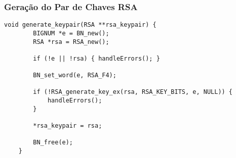 \documentclass[a4paper,12pt]{article}
\begin{document}
\subsubsection*{Geração do Par de Chaves RSA}
\begin{lstlisting}[style=CStyle]
    void generate_keypair(RSA **rsa_keypair) {
        BIGNUM *e = BN_new();
        RSA *rsa = RSA_new();

        if (!e || !rsa) { handleErrors(); }

        BN_set_word(e, RSA_F4);

        if (!RSA_generate_key_ex(rsa, RSA_KEY_BITS, e, NULL)) {
            handleErrors();
        }

        *rsa_keypair = rsa;

        BN_free(e);
    }
\end{lstlisting}
\end{document}

